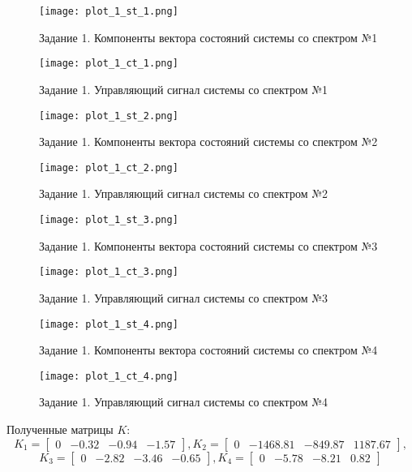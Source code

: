 \begin{figure}[]
    \centering
    \texttt{[image: plot\_1\_st\_1.png]}
    \caption{\label{fig:The-caption-1}Задание 1. Компоненты вектора состояний системы со спектром №1}
\end{figure}
\begin{figure}[]
    \centering
    \texttt{[image: plot\_1\_ct\_1.png]}
    \caption{\label{fig:The-caption-1}Задание 1. Управляющий сигнал системы со спектром №1}
\end{figure}
\begin{figure}[]
    \centering
    \texttt{[image: plot\_1\_st\_2.png]}
    \caption{\label{fig:The-caption-1}Задание 1. Компоненты вектора состояний системы со спектром №2}
\end{figure}
\begin{figure}[]
    \centering
    \texttt{[image: plot\_1\_ct\_2.png]}
    \caption{\label{fig:The-caption-1}Задание 1. Управляющий сигнал системы со спектром №2}
\end{figure}
\begin{figure}[]
    \centering
    \texttt{[image: plot\_1\_st\_3.png]}
    \caption{\label{fig:The-caption-1}Задание 1. Компоненты вектора состояний системы со спектром №3}
\end{figure}
\begin{figure}[]
    \centering
    \texttt{[image: plot\_1\_ct\_3.png]}
    \caption{\label{fig:The-caption-1}Задание 1. Управляющий сигнал системы со спектром №3}
\end{figure}
\begin{figure}[]
    \centering
    \texttt{[image: plot\_1\_st\_4.png]}
    \caption{\label{fig:The-caption-1}Задание 1. Компоненты вектора состояний системы со спектром №4}
\end{figure}
\begin{figure}[]
    \centering
    \texttt{[image: plot\_1\_ct\_4.png]}
    \caption{\label{fig:The-caption-1}Задание 1. Управляющий сигнал системы со спектром №4}
\end{figure}
\pagebreak
Полученные матрицы $K$:
\begin{equation*}
    K_1 = \begin{bmatrix}
        0 & -0.32 & -0.94 & -1.57
    \end{bmatrix},
    K_2 = \begin{bmatrix}
        0 & -1468.81 & -849.87 & 1187.67
    \end{bmatrix},
\end{equation*}
\begin{equation*}
    K_3 = \begin{bmatrix}
        0 & -2.82 & -3.46 & -0.65
    \end{bmatrix},
    K_4 = \begin{bmatrix}
        0 & -5.78 & -8.21 & 0.82
    \end{bmatrix}
\end{equation*}
\pagebreak

